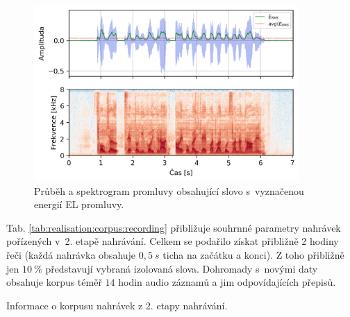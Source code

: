 \begin{figure}[hbpt]
  \centering
  \includegraphics[width=0.9\textwidth]{./ch5-construction/img/energy_spec_sentence.png}
  \caption[Průběh a spektrogram promluvy obsahující slovo .]{Průběh a spektrogram promluvy obsahující slovo  s~vyznačenou energií EL promluvy.}
  \label{fig:realisation:corpus:sentence}
\end{figure}

Tab. \ref{tab:realisation:corpus:recording} přibližuje souhrnné parametry nahrávek pořízených v~2. etapě nahrávání.
Celkem se podařilo získat přibližně 2 hodiny řeči (každá nahrávka obsahuje $0,5\ s$ ticha na začátku a konci).
Z toho přibližně jen $10~\%$ představují vybraná izolovaná slova.
Dohromady s~novými daty obsahuje korpus téměř $14$ hodin audio záznamů a jim odpovídajících přepisů.

\begin{table}[htpb]
  \centering
  \def\arraystretch{1.5}
  \caption{Informace o korpusu nahrávek z 2. etapy nahrávání.}
  \label{tab:realisation:corpus:recording}
\end{table}

